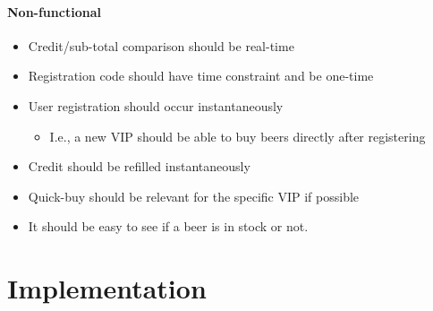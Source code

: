 \documentclass{article}
\begin{document}
\subsection{Non-functional}
\begin{itemize}
\item Credit/sub-total comparison should be real-time
\item Registration code should have time constraint and be one-time
\item User registration should occur instantaneously

  \begin{itemize}
  \item I.e., a new VIP should be able to buy beers directly after registering
  \end{itemize}
\item Credit should be refilled instantaneously
\item Quick-buy should be relevant for the specific VIP if possible
\item It should be easy to see if a beer is in stock or not.
\end{itemize}

\part{Implementation}
\end{document}
